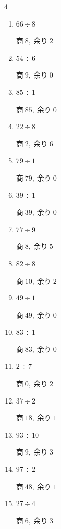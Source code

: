 \begin{multicols}{4}
\begin{enumerate}
        $商\; 3,\; 余り\; 4$

  \item $66 \div 8$

        $商\; 8,\; 余り\; 2$

  \item $54 \div 6$

        $商\; 9,\; 余り\; 0$

  \item $85 \div 1$

        $商\; 85,\; 余り\; 0$

  \item $22 \div 8$

        $商\; 2,\; 余り\; 6$

  \item $79 \div 1$

        $商\; 79,\; 余り\; 0$

  \item $39 \div 1$

        $商\; 39,\; 余り\; 0$

  \item $77 \div 9$

        $商\; 8,\; 余り\; 5$

  \item $82 \div 8$

        $商\; 10,\; 余り\; 2$

  \item $49 \div 1$

        $商\; 49,\; 余り\; 0$

  \item $83 \div 1$

        $商\; 83,\; 余り\; 0$

  \item $2 \div 7$

        $商\; 0,\; 余り\; 2$

  \item $37 \div 2$

        $商\; 18,\; 余り\; 1$

  \item $93 \div 10$

        $商\; 9,\; 余り\; 3$

  \item $97 \div 2$

        $商\; 48,\; 余り\; 1$

  \item $27 \div 4$

        $商\; 6,\; 余り\; 3$


\end{enumerate}
\end{multicols}
